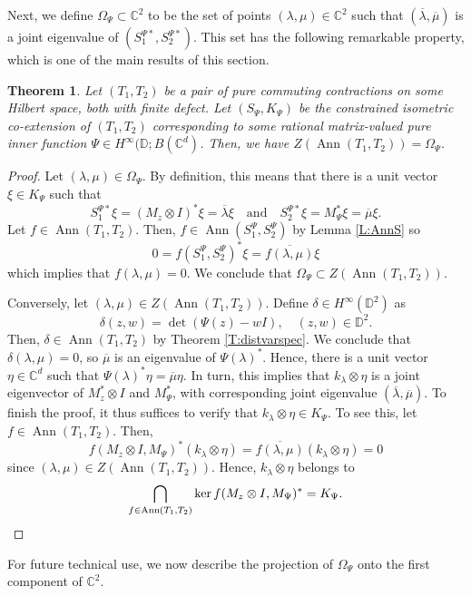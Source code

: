 \documentclass[10pt]{amsart}
\newcommand{\bC}{{\mathbb{C}}}
\newcommand{\bD}{{\mathbb{D}}}
\newcommand{\ol}{\overline}
\newcommand{\qand}{\quad\text{and}\quad}
\newcommand{\Ann}{\operatorname{Ann}}
\newtheorem{theorem}[lemma]{Theorem}
\theoremstyle{definition}
\begin{document}
Next, we define $\Omega_\Psi\subset \bC^2$ to be the set of points $(\lambda,\mu)\in \bC^2$ such that $(\ol{\lambda},\ol{\mu})$ is a joint eigenvalue of $(S_1^{\Psi*},S_2^{\Psi*})$. This set has the following remarkable property, which is one of the main results of this section.

\begin{theorem}\label{T:ZAnn}
Let $(T_1,T_2)$ be a pair of pure commuting contractions on some Hilbert space, both with finite defect.  Let $(S_\Psi,K_\Psi)$ be the constrained isometric co-extension of $(T_1,T_2)$ corresponding to some rational matrix-valued pure inner function $\Psi\in H^\infty(\bD;B(\bC^d)$. Then, we have $Z(\Ann(T_1,T_2))=\Omega_\Psi$.
\end{theorem}
\begin{proof}
Let $(\lambda,\mu)\in \Omega_\Psi$. By definition, this means that there is a unit vector $\xi\in K_\Psi$ such that
\[
S_1^{\Psi*}\xi=(M_z\otimes I)^* \xi=\ol{\lambda}\xi \qand S_2^{\Psi*}\xi=M_\Psi^*\xi=\ol{\mu}\xi.
\]
Let $f\in \Ann(T_1,T_2)$. Then, $f\in \Ann(S^\Psi_1,S^\Psi_2)$ by Lemma \ref{L:AnnS} so
\[
0=f(S^\Psi_1,S^\Psi_2)^*\xi=\ol{f(\lambda,\mu)}\xi
\]
which implies that $f(\lambda,\mu)=0$. We conclude that $\Omega_\Psi\subset Z(\Ann(T_1,T_2))$.

Conversely, let $(\lambda,\mu)\in Z(\Ann(T_1,T_2))$. Define $\delta\in H^\infty(\bD^2)$ as
\[
\delta(z,w)=\det(\Psi(z)-w I), \quad (z,w)\in \bD^2.
\]
Then, $\delta\in \Ann(T_1,T_2)$ by Theorem \ref{T:distvarspec}. We conclude that $\delta(\lambda,\mu)=0$, so $\ol{\mu}$ is an eigenvalue of $\Psi(\lambda)^*$. Hence, there is a unit vector $\eta\in \bC^d$ such that $\Psi(\lambda)^*\eta=\ol{\mu}\eta$. In turn, this implies that $k_\lambda\otimes \eta$ is a joint eigenvector of $M_z^*\otimes I$ and $M_\Psi^*$, with corresponding joint eigenvalue $(\ol{\lambda},\ol{\mu})$. To finish the proof, it thus suffices to verify that $k_\lambda\otimes \eta\in K_\Psi$. 
To see this, let $f\in \Ann(T_1,T_2)$. Then, 
\[
f(M_z\otimes I,M_\Psi)^*(k_\lambda\otimes \eta)=\ol{f(\lambda,\mu)} (k_\lambda \otimes \eta)=0
\]
since $(\lambda,\mu)\in Z(\Ann(T_1,T_2))$. Hence, $k_\lambda\otimes \eta$ belongs to
\[ \bigcap_{f\in \Ann(T_1,T_2)}\ker f(M_z\otimes I,M_\Psi)^*=K_\Psi.\qedhere\]
\end{proof}

For future technical use, we now describe the projection of $\Omega_\Psi$ onto the first component of $\bC^2$.
\end{document}
